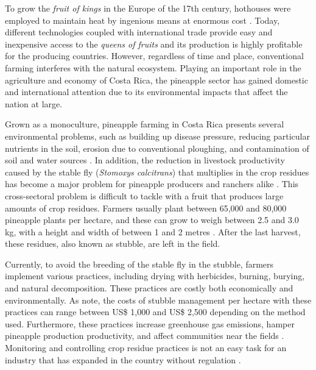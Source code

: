 To grow the \textit{fruit of kings} in the Europe of the 17th century, hothouses were employed to maintain heat by ingenious means at enormous cost \citep{o2013pineapple}. Today, different technologies coupled with international trade provide easy and inexpensive access to the \textit{queens of fruits} and its production is highly profitable for the producing countries. However, regardless of time and place, conventional farming interferes with the natural ecosystem. Playing an important role in the agriculture and economy of Costa Rica, the pineapple sector has gained domestic and international attention due to its environmental impacts that affect the nation at large.

Grown as a monoculture, pineapple farming in Costa Rica presents several environmental problems, such as building up disease pressure, reducing particular nutrients in the soil, erosion due to conventional ploughing, and contamination of soil and water sources \citep{rodriguez2020agricultural, salaheen2019organic}. In addition, the reduction in livestock productivity caused by the stable fly (\textit{Stomoxys calcitrans}) that multiplies in the crop residues has become a major problem for pineapple producers and ranchers alike \citep{alpizar2016analisis, elbersen2019costa}. This cross-sectoral problem is difficult to tackle with a fruit that produces large amounts of crop residues. Farmers usually plant between 65,000 and 80,000 pineapple plants per hectare, and these can grow to weigh between 2.5 and 3.0 kg, with a height and width of between 1 and 2 metres \citep{asim2015review}. After the last harvest, these residues, also known as stubble, are left in the field. 


Currently, to avoid the breeding of the stable fly in the stubble, farmers implement various practices, including drying with herbicides, burning, burying, and natural decomposition. These practices are costly both economically and environmentally. As \cite{hernandez2018impacto} note, the costs of stubble management per hectare with these practices can range between US\$ 1,000 and US\$ 2,500 depending on the method used. Furthermore, these practices increase greenhouse gas emissions, hamper pineapple production productivity, and affect communities near the fields \citep{cesarino2020fabrication,netz2007climate}. Monitoring and controlling crop residue practices is not an easy task for an industry that has expanded in the country without regulation \citep{rodriguez2020agricultural}.

